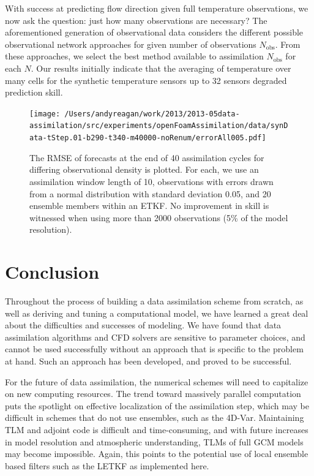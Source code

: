 \documentclass[12pt]{report}
\begin{document}
With success at predicting flow direction given full temperature observations, we now ask the question: just how many observations are necessary?
The aforementioned generation of observational data considers the different possible observational network approaches for given number of observations $N_\text{obs}$.
From these approaches, we select the best method available to assimilation $N_\text{obs}$ for each $N$.
Our results initially indicate that the averaging of temperature over many cells for the synthetic temperature sensors up to 32 sensors degraded prediction skill.

\begin{figure}[h!]
  \centering
  \texttt{[image: /Users/andyreagan/work/2013/2013-05data-assimilation/src/experiments/openFoamAssimilation/data/synData-tStep.01-b290-t340-m40000-noRenum/errorAll005.pdf]}
  \caption[The RMSE of forecasts at the end of 40 assimilation cycles for differing observational density is plotted]
  {
    The RMSE of forecasts at the end of 40 assimilation cycles for differing observational density is plotted.
    For each, we use an assimilation window length of 10, observations with errors drawn from a normal distribution with standard deviation 0.05, and 20 ensemble members within an ETKF.
    No improvement in skill is witnessed when using more than 2000 observations (5\% of the model resolution).
  }
  \label{fig:obsexp}
\end{figure}


\section{Conclusion}

Throughout the process of building a data assimilation scheme from scratch, as well as deriving and tuning a computational model, we have learned a great deal about the difficulties and successes of modeling.
We have found that data assimilation algorithms and CFD solvers are sensitive to parameter choices, and cannot be used successfully without an approach that is specific to the problem at hand.
Such an approach has been developed, and proved to be successful.

For the future of data assimilation, the numerical schemes will need to capitalize on new computing resources.
The trend toward massively parallel computation puts the spotlight on effective localization of the assimilation step, which may be difficult in schemes that do not use ensembles, such as the 4D-Var.
Maintaining TLM and adjoint code is difficult and time-consuming, and with future increases in model resolution and atmospheric understanding, TLMs of full GCM models may become impossible.
Again, this points to the potential use of local ensemble based filters such as the LETKF as implemented here.
\end{document}
